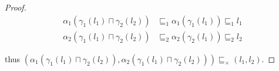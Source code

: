 \documentclass{article}
\begin{document}
\begin{proof}
  \begin{align*}
    \alpha_1(\gamma_1(l_1) \sqcap \gamma_2(l_2)) &\sqsubseteq_1 
      \alpha_1(\gamma_1(l_1)) \sqsubseteq_1 l_1 \\
    \alpha_2(\gamma_1(l_1) \sqcap \gamma_2(l_2)) &\sqsubseteq_2 
      \alpha_2(\gamma_2(l_1)) \sqsubseteq_2 l_2
  \end{align*}

  thus $(\alpha_1(\gamma_1(l_1) \sqcap \gamma_2(l_2)), 
  \alpha_2(\gamma_1(l_1) \sqcap \gamma_2(l_2))) 
  \sqsubseteq_\times (l_1, l_2)$.
\end{proof}
\end{document}
